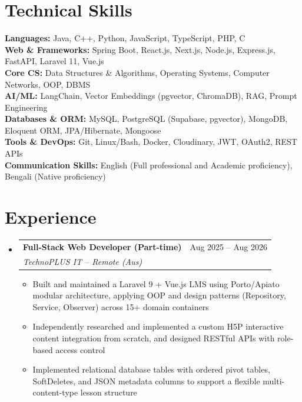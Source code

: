 \documentclass[letterpaper,10.5pt]{article}
\makeatletter
\newcommand{\resumeItem}[1]{%
  \item\small{#1}\par\vspace{-2pt}%
}
\newcommand{\resumeSubheading}[4]{
  \vspace{-2pt}\item
    \begin{tabular*}{\textwidth}[t]{l@{\extracolsep{\fill}}r}
      \textbf{#1} & #2 \\
      \textit{\small#3} & \textit{\small #4} \\
    \end{tabular*}\vspace{-7pt}
}
\newcommand{\resumeSubHeadingListStart}{\begin{itemize}[leftmargin=0.0in, label={}]}
\newcommand{\resumeSubHeadingListEnd}{\end{itemize}}
\newcommand{\resumeItemListStart}{\begin{itemize}[leftmargin=0.15in]}
\newcommand{\resumeItemListEnd}{\end{itemize}\vspace{-5pt}}
\makeatother
\begin{document}
\section{Technical Skills}
 \begin{itemize}[leftmargin=0.0in, label={}]
    \small{\item{
     \textbf{Languages:} Java, C++, Python, JavaScript, TypeScript, PHP, C \\[1pt]
     \textbf{Web \& Frameworks:} Spring Boot, React.js, Next.js, Node.js, Express.js, FastAPI, Laravel 11, Vue.js \\[1pt]
     \textbf{Core CS:} Data Structures \& Algorithms, Operating Systems, Computer Networks, OOP, DBMS \\[1pt]
     \textbf{AI/ML:} LangChain, Vector Embeddings (pgvector, ChromaDB), RAG, Prompt Engineering \\[1pt]
     \textbf{Databases \& ORM:} MySQL, PostgreSQL (Supabase, pgvector), MongoDB, Eloquent ORM, JPA/Hibernate, Mongoose \\[1pt]
     \textbf{Tools \& DevOps:} Git, Linux/Bash, Docker, Cloudinary, JWT, OAuth2, REST APIs \\[1pt]
     \textbf{Communication Skills:} English (Full professional and Academic proficiency), Bengali (Native proficiency)
    }}
 \end{itemize}
\vspace{-8pt}

\section{Experience}
  \resumeSubHeadingListStart
    \resumeSubheading
      {Full-Stack Web Developer (Part-time)}{Aug 2025 -- Aug 2026}
      {TechnoPLUS IT -- Remote (Aus)}{}
      \resumeItemListStart
        \resumeItem{Built and maintained a Laravel 9 + Vue.js LMS using Porto/Apiato modular architecture, applying OOP and design patterns (Repository, Service, Observer) across 15+ domain containers}
        \resumeItem{Independently researched and implemented a custom H5P interactive content integration from scratch, and designed RESTful APIs with role-based access control}
        \resumeItem{Implemented relational database tables with ordered pivot tables, SoftDeletes, and JSON metadata columns to support a flexible multi-content-type lesson structure}
      \resumeItemListEnd
  \resumeSubHeadingListEnd
\vspace{-8pt}
\end{document}
